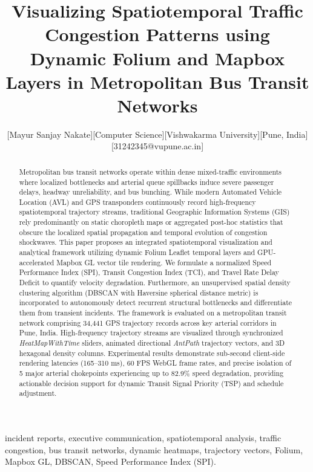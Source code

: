 \documentclass[conference]{IEEEtran}
\begin{document}
\title{Visualizing Spatiotemporal Traffic Congestion Patterns using Dynamic Folium and Mapbox Layers in Metropolitan Bus Transit Networks}

\author{[Mayur Sanjay Nakate][Computer Science][Vishwakarma University][Pune, India][31242345@vupune.ac.in]}

\maketitle

\begin{abstract}
Metropolitan bus transit networks operate within dense mixed-traffic environments where localized bottlenecks and arterial queue spillbacks induce severe passenger delays, headway unreliability, and bus bunching. While modern Automated Vehicle Location (AVL) and GPS transponders continuously record high-frequency spatiotemporal trajectory streams, traditional Geographic Information Systems (GIS) rely predominantly on static choropleth maps or aggregated post-hoc statistics that obscure the localized spatial propagation and temporal evolution of congestion shockwaves. This paper proposes an integrated spatiotemporal visualization and analytical framework utilizing dynamic Folium Leaflet temporal layers and GPU-accelerated Mapbox GL vector tile rendering. We formulate a normalized Speed Performance Index (SPI), Transit Congestion Index (TCI), and Travel Rate Delay Deficit to quantify velocity degradation. Furthermore, an unsupervised spatial density clustering algorithm (DBSCAN with Haversine spherical distance metric) is incorporated to autonomously detect recurrent structural bottlenecks and differentiate them from transient incidents. The framework is evaluated on a metropolitan transit network comprising 34,441 GPS trajectory records across key arterial corridors in Pune, India. High-frequency trajectory streams are visualized through synchronized \textit{HeatMapWithTime} sliders, animated directional \textit{AntPath} trajectory vectors, and 3D hexagonal density columns. Experimental results demonstrate sub-second client-side rendering latencies (165--310 ms), 60 FPS WebGL frame rates, and precise isolation of 5 major arterial chokepoints experiencing up to 82.9\% speed degradation, providing actionable decision support for dynamic Transit Signal Priority (TSP) and schedule adjustment.
\end{abstract}

\begin{IEEEkeywords}
incident reports, executive communication, spatiotemporal analysis, traffic congestion, bus transit networks, dynamic heatmaps, trajectory vectors, Folium, Mapbox GL, DBSCAN, Speed Performance Index (SPI).
\end{IEEEkeywords}
\end{document}
